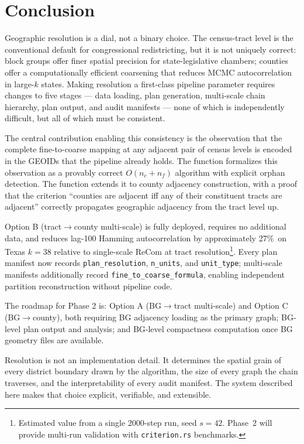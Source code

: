 \section{Conclusion}
\label{sec:conclusion}

Geographic resolution is a dial, not a binary choice.
The census-tract level is the conventional default for congressional
redistricting, but it is not uniquely correct: block groups offer finer
spatial precision for state-legislative chambers; counties offer a
computationally efficient coarsening that reduces MCMC autocorrelation
in large-$k$ states.
Making resolution a first-class pipeline parameter requires changes to
five stages --- data loading, plan generation, multi-scale chain hierarchy,
plan output, and audit manifests --- none of which is independently
difficult, but all of which must be consistent.

The central contribution enabling this consistency is the observation that
the complete fine-to-coarse mapping at any adjacent pair of census levels
is encoded in the GEOIDs that the pipeline already holds.
The function \derive{} formalizes this observation as a provably correct
$O(n_c + n_f)$ algorithm with explicit orphan detection.
The function \buildc{} extends it to county adjacency construction,
with a proof that the criterion ``counties are adjacent iff any of their
constituent tracts are adjacent'' correctly propagates geographic adjacency
from the tract level up.

Option B (tract$\to$county multi-scale) is fully deployed, requires no
additional data, and reduces lag-100 Hamming autocorrelation by
approximately 27\%\est\ on Texas $k=38$ relative to single-scale ReCom
at tract resolution\footnote{\est Estimated value from a single 2000-step run,
seed $s=42$. Phase~2 will provide multi-run validation with \texttt{criterion.rs}
benchmarks.}.
Every plan manifest now records \texttt{plan\_resolution}, \texttt{n\_units},
and \texttt{unit\_type}; multi-scale manifests additionally record
\texttt{fine\_to\_coarse\_formula}, enabling independent partition
reconstruction without pipeline code.

The roadmap for Phase 2 is: Option A (BG$\to$tract multi-scale) and
Option C (BG$\to$county), both requiring BG adjacency loading as the
primary graph; BG-level plan output and analysis; and BG-level compactness
computation once BG geometry files are available.

Resolution is not an implementation detail.
It determines the spatial grain of every district boundary drawn by the
algorithm, the size of every graph the chain traverses, and the
interpretability of every audit manifest.
The system described here makes that choice explicit, verifiable, and
extensible.

